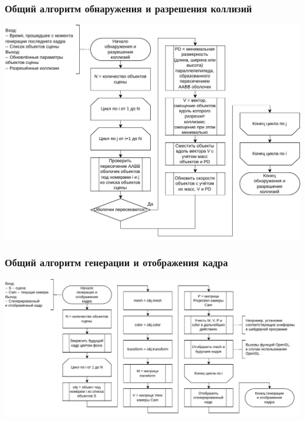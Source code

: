 \documentclass{beamer}
\begin{document}
\begin{frame}
\frametitle{Общий алгоритм обнаружения и разрешения коллизий}
\centering
\includegraphics[scale=0.55]{diag/collisions-algo.pdf}
\end{frame}

\begin{frame}
\frametitle{Общий алгоритм генерации и отображения кадра}
\centering
\includegraphics[scale=0.48]{diag/frame-gen-algo.pdf}
\end{frame}
\end{document}
